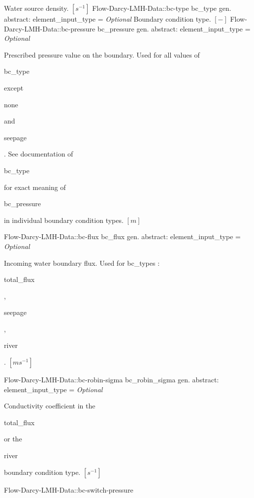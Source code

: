 \begin{RecordType}
			{{{Water source density. }{$[s^{-1}]$}%
}}
		\RecKey
			{Flow-Darcy-LMH-Data::bc-type}
			{bc{\_}type}
			{{gen. abstract: }}{{element{\_}input{\_}type}{ = }}
			{ \it{Optional}}
			{{{Boundary condition type. }{$[-]$}%
}}
		\RecKey
			{Flow-Darcy-LMH-Data::bc-pressure}
			{bc{\_}pressure}
			{{gen. abstract: }}{{element{\_}input{\_}type}{ = }}
			{ \it{Optional}}
			{{{Prescribed pressure value on the boundary.
Used for all values of }\begin{ttfamily}bc{\_}type\end{ttfamily}{ except }\begin{ttfamily}none\end{ttfamily}{ and }\begin{ttfamily}seepage\end{ttfamily}{. See documentation of }\begin{ttfamily}bc{\_}type\end{ttfamily}{ for exact meaning of }\begin{ttfamily}bc{\_}pressure\end{ttfamily}{ in individual boundary condition types. }{$[m]$}%
}}
		\RecKey
			{Flow-Darcy-LMH-Data::bc-flux}
			{bc{\_}flux}
			{{gen. abstract: }}{{element{\_}input{\_}type}{ = }}
			{ \it{Optional}}
			{{{Incoming water boundary flux.
Used for bc{\_}types : }\begin{ttfamily}total{\_}flux\end{ttfamily}{, }\begin{ttfamily}seepage\end{ttfamily}{, }\begin{ttfamily}river\end{ttfamily}{. }{$[ms^{-1}]$}%
}}
		\RecKey
			{Flow-Darcy-LMH-Data::bc-robin-sigma}
			{bc{\_}robin{\_}sigma}
			{{gen. abstract: }}{{element{\_}input{\_}type}{ = }}
			{ \it{Optional}}
			{{{Conductivity coefficient in the }\begin{ttfamily}total{\_}flux\end{ttfamily}{ or the }\begin{ttfamily}river\end{ttfamily}{ boundary condition type. }{$[s^{-1}]$}%
}}
		\RecKey
			{Flow-Darcy-LMH-Data::bc-switch-pressure}

\end{RecordType}

